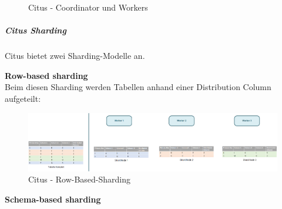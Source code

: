 \begin{flushleft}
\begin{flushleft}
\begin{figure}[H]
            \caption{Citus - Coordinator und Workers}
            \label{fig:citus_coordinator_worker}
        \end{figure}
    \end{flushleft}
    \begin{flushleft}
        \subparagraph{Citus Sharding}
        \label{subpar:citus_sharding}
        Citus bietet zwei Sharding-Modelle an.
        \begin{flushleft}
            \textbf{Row-based sharding}\\
            Beim diesen Sharding werden Tabellen anhand einer Distribution Column aufgeteilt\cite{2Y5FA36C, FDUUL9IM}:
            \begin{figure}[H]
                \centering
                \includegraphics[width=0.8\linewidth]{source/implementation/evaluation/postgresql_ha_solutions/stackgres/citus_row-based-sharding}
                \caption{Citus - Row-Based-Sharding}
                \label{fig:citus_row-based-sharding}
            \end{figure}
        \end{flushleft}
        \begin{flushleft}
            \textbf{Schema-based sharding}\\


\end{flushleft}
\end{flushleft}
\end{flushleft}
